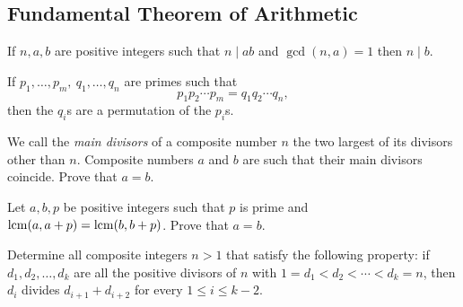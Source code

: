 \subsection{Fundamental Theorem of Arithmetic}\label{n:n:ftoa}
\begin{result}{\label{r:i:n:f:1}}
    If $n,a,b$ are positive integers such that $n\mid ab$ and
      $\gcd(n,a)=1$ then $n\mid b$.
\end{result}
\begin{result}{\label{r:i:n:f:2}}
    If $p_1,\ldots,p_m,\ q_1,\ldots,q_n$ are primes such that
      \[p_1p_2\cdots p_m=q_1q_2\cdots q_n,\]
      then the $q_i$s are a permutation of the $p_i$s.
\end{result}
\begin{problem}{\label{p:i:n:f:1}}
    We call the \emph{main divisors} of a composite number $n$ the two
    largest of its divisors other than $n$. Composite numbers $a$ and $b$ are
    such that their main divisors coincide. Prove that $a=b$.
\end{problem}
\begin{problem}{\label{p:i:n:f:2}}
    Let $a,b,p$ be positive integers such that $p$ is prime and
    $\mathrm{lcm}(a,a+p)=\mathrm{lcm}(b,b+p)$. Prove that $a=b$.
\end{problem}
\begin{problem}{\label{p:i:n:f:3}}
    Determine all composite integers $n>1$ that satisfy the following
    property: if $d_1, d_2, \ldots, d_k$ are all the positive divisors of $n$
    with $1=d_1<d_2<\cdots<d_k=n$, then $d_i$ divides $d_{i+1}+d_{i+2}$ for
    every $1 \leq i \leq k-2$.
\end{problem}
